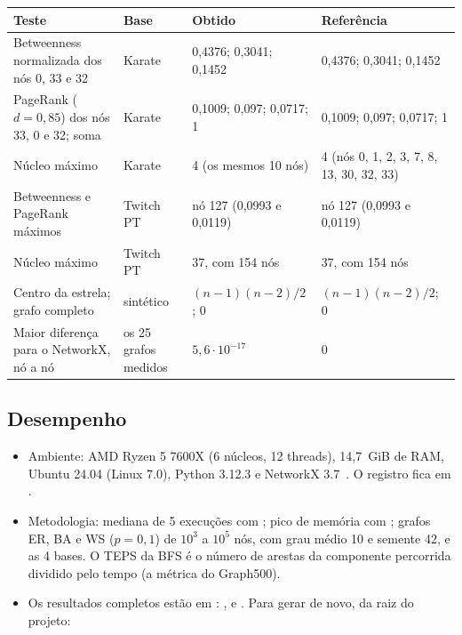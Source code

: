 {\small\begin{tabularx}{\linewidth}{@{}Y L{2.5cm} L{2.2cm} L{3.8cm}@{}}
\toprule
Teste & Base & Obtido & Referência \\
\midrule
Betweenness normalizada dos nós 0, 33 e 32 & Karate & 0,4376; 0,3041; 0,1452 & 0,4376; 0,3041; 0,1452 \\
PageRank ($d = 0{,}85$) dos nós 33, 0 e 32; soma & Karate & 0,1009; 0,097; 0,0717; 1 & 0,1009; 0,097; 0,0717; 1 \\
Núcleo máximo & Karate & 4 (os mesmos 10 nós) & 4 (nós 0, 1, 2, 3, 7, 8, 13, 30, 32, 33) \\
Betweenness e PageRank máximos & Twitch PT & nó 127 (0,0993 e 0,0119) & nó 127 (0,0993 e 0,0119) \\
Núcleo máximo & Twitch PT & 37, com 154 nós & 37, com 154 nós \\
Centro da estrela; grafo completo & sintético & $(n-1)(n-2)/2$; 0 & $(n-1)(n-2)/2$; 0 \\
Maior diferença para o NetworkX, nó a nó & os 25 grafos medidos & $5{,}6 \cdot 10^{-17}$ & 0 \\
\bottomrule
\end{tabularx}}

\subsection{Desempenho}
\begin{itemize}[leftmargin=*]
  \item Ambiente: AMD Ryzen 5 7600X (6 núcleos, 12 threads), 14,7~GiB de RAM, Ubuntu 24.04 (Linux 7.0), Python 3.12.3 e NetworkX 3.7~\cite{hagberg2008}. O registro fica em .
  \item Metodologia: mediana de 5 execuções com ; pico de memória com
        ; grafos ER, BA e WS ($p = 0{,}1$) de $10^3$ a $10^5$ nós, com grau médio 10 e semente 42, e as 4 bases. O TEPS da BFS é o número de arestas da componente percorrida dividido pelo tempo (a métrica do Graph500).
  \item Os resultados completos estão em : ,  e . Para gerar de novo, da raiz do projeto:\\
        \\
        \\
\end{itemize}

